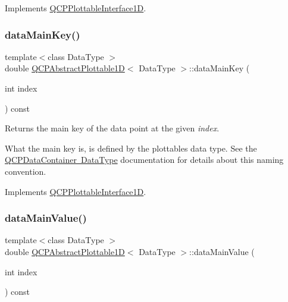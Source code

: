 Implements \mbox{\hyperlink{class_q_c_p_plottable_interface1_d_a058a22c770ef4d5a0e878a7f02183da9}{Q\+C\+P\+Plottable\+Interface1D}}.

\mbox{\label{class_q_c_p_abstract_plottable1_d_ab14ab428595856bf76e04499017fa8dc}} 
\subsubsection{\texorpdfstring{data\+Main\+Key()}{dataMainKey()}}
{\footnotesize\ttfamily template$<$class Data\+Type $>$ \\
double \mbox{\hyperlink{class_q_c_p_abstract_plottable1_d}{Q\+C\+P\+Abstract\+Plottable1D}}$<$ Data\+Type $>$\+::data\+Main\+Key (\begin{DoxyParamCaption}\item[{int}]{index }\end{DoxyParamCaption}) const\hspace{0.3cm}{\ttfamily [virtual]}}





Returns the main key of the data point at the given {\itshape index}.

What the main key is, is defined by the plottable\textquotesingle{}s data type. See the \mbox{\hyperlink{class_q_c_p_data_container_qcpdatacontainer-datatype}{Q\+C\+P\+Data\+Container Data\+Type}} documentation for details about this naming convention. 

Implements \mbox{\hyperlink{class_q_c_p_plottable_interface1_d_a2bd60daaac046945fead558cbd83cf73}{Q\+C\+P\+Plottable\+Interface1D}}.

\mbox{\label{class_q_c_p_abstract_plottable1_d_a0f913bb0889ca7cb574657a078fc8cff}} 
\subsubsection{\texorpdfstring{data\+Main\+Value()}{dataMainValue()}}
{\footnotesize\ttfamily template$<$class Data\+Type $>$ \\
double \mbox{\hyperlink{class_q_c_p_abstract_plottable1_d}{Q\+C\+P\+Abstract\+Plottable1D}}$<$ Data\+Type $>$\+::data\+Main\+Value (\begin{DoxyParamCaption}\item[{int}]{index }\end{DoxyParamCaption}) const\hspace{0.3cm}{\ttfamily [virtual]}}





